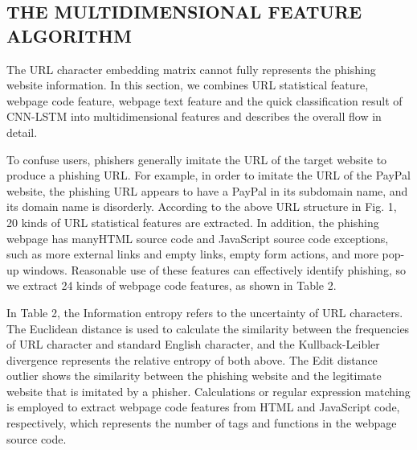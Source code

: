 \documentclass{ieeeaccess}
\begin{document}
\subsection{THE MULTIDIMENSIONAL FEATURE ALGORITHM}
The URL character embedding matrix cannot fully represents
the phishing website information. In this section, we combines
URL statistical feature, webpage code feature, webpage
text feature and the quick classification result of CNN-LSTM
into multidimensional features and describes the overall flow
in detail.
\par To confuse users, phishers generally imitate the URL of
the target website to produce a phishing URL. For example,
in order to imitate the URL of the PayPal website, the phishing
URL appears to have a PayPal in its subdomain name, and
its domain name is disorderly. According to the above URL
structure in Fig. 1, 20 kinds of URL statistical features are
extracted. In addition, the phishing webpage has manyHTML
source code and JavaScript source code exceptions, such as
more external links and empty links, empty form actions,
and more pop-up windows. Reasonable use of these features
can effectively identify phishing, so we extract 24 kinds of
webpage code features, as shown in Table 2.
\par In Table 2, the Information entropy refers to the uncertainty
of URL characters. The Euclidean distance is used to calculate
the similarity between the frequencies of URL character
and standard English character, and the Kullback-Leibler
divergence represents the relative entropy of both above.
The Edit distance outlier shows the similarity between the
phishing website and the legitimate website that is imitated
by a phisher. Calculations or regular expression matching is
employed to extract webpage code features from HTML and
JavaScript code, respectively, which represents the number of
tags and functions in the webpage source code.
\end{document}
